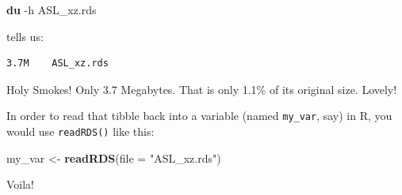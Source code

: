 \documentclass[]{book}
\newenvironment{Shaded}{\begin{snugshade}}{\end{snugshade}}
\newcommand{\KeywordTok}[1]{\textcolor[rgb]{0.13,0.29,0.53}{\textbf{{#1}}}}
\newcommand{\DataTypeTok}[1]{\textcolor[rgb]{0.13,0.29,0.53}{{#1}}}
\newcommand{\StringTok}[1]{\textcolor[rgb]{0.31,0.60,0.02}{{#1}}}
\newcommand{\NormalTok}[1]{{#1}}
\theoremstyle{definition}
\theoremstyle{definition}
\theoremstyle{remark}
\begin{document}
\begin{Shaded}
\begin{Highlighting}[]
\KeywordTok{du} \NormalTok{-h ASL_xz.rds}
\end{Highlighting}
\end{Shaded}

tells us:

\begin{verbatim}
3.7M    ASL_xz.rds
\end{verbatim}

Holy Smokes! Only 3.7 Megabytes. That is only 1.1\% of its original
size. Lovely!

In order to read that tibble back into a variable (named
\texttt{my\_var}, say) in R, you would use \texttt{readRDS()} like this:

\begin{Shaded}
\begin{Highlighting}[]
\NormalTok{my_var <-}\StringTok{ }\KeywordTok{readRDS}\NormalTok{(}\DataTypeTok{file =} \StringTok{"ASL_xz.rds"}\NormalTok{)}
\end{Highlighting}
\end{Shaded}

Voila!


\end{document}

